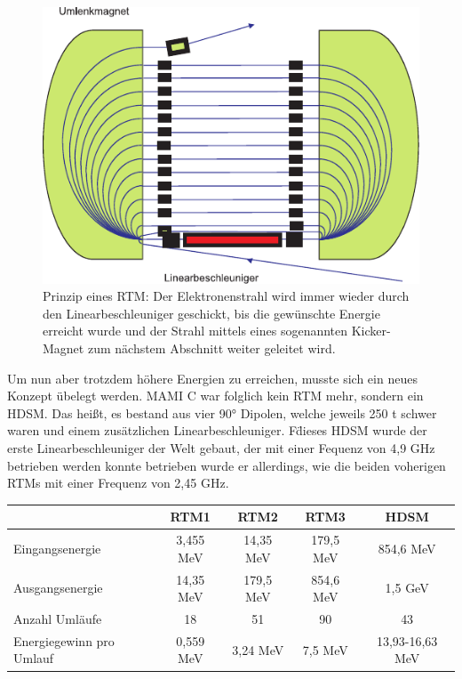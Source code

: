 \documentclass[a4paper,11pt,oneside,final,german,openbib,pdftex]{scrbook}
\begin{document}
{\begin{figure}[h]
	\begin{center}
	\includegraphics{RTM}	
	\caption{Prinzip eines RTM: Der Elektronenstrahl wird immer wieder durch den Linearbeschleuniger geschickt, bis die gew\"unschte Energie erreicht wurde und der Strahl mittels eines sogenannten Kicker-Magnet zum n\"achstem Abschnitt weiter geleitet wird.\cite{KPh07} }
	\label{fig.RTM}
\end{center}
\end{figure}

Um nun aber trotzdem h\"ohere Energien zu erreichen, musste sich ein neues Konzept \"ubelegt werden. MAMI C war folglich kein RTM mehr, sondern ein HDSM. Das hei{\ss}t, es bestand aus vier 90° Dipolen, welche jeweils 250 t schwer waren und einem zus\"atzlichen Linearbeschleuniger. F\" dieses HDSM wurde der erste Linearbeschleuniger der Welt gebaut, der mit einer Fequenz von 4,9 GHz betrieben werden konnte betrieben wurde er allerdings, wie die beiden voherigen RTMs mit einer Frequenz von 2,45 GHz.
\newline
\begin{table}[h]
	\begin{center}
		\begin{tabular}{|l|c|c|c|c|}
			\hline
			& RTM1 & RTM2 & RTM3 & HDSM \\
			\hline
			\hline
			Eingangsenergie &3,455 MeV  &  14,35 MeV& 179,5 MeV  &854,6 MeV \\ \hline
			Ausgangsenergie &14,35 MeV  &  179,5 MeV &854,6 MeV  & 1,5 GeV \\ \hline
			Anzahl Uml\"aufe&18  &51  &90  &43 \\ \hline
			Energiegewinn pro Umlauf &0,559 MeV  & 3,24 MeV & 7,5 MeV  & 13,93-16,63 MeV \\ \hline
			

\end{tabular}
\end{center}
\end{table}}
\end{document}
